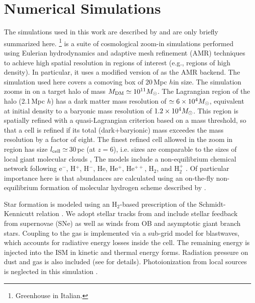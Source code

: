 \IfFileExists{emulateapjlegacy.cls}{\documentclass[iop]{emulateapjlegacy}}{\documentclass[iop]{emulateapj}}
\begin{document}
\section{Numerical Simulations}\label{sec:sim}
The simulations used in this work are described by \citealt{Pallottini17a, Pallottini17b} and are only briefly summarized here.
%
\footnote{Greenhouse in Italian.} is a suite of cosmological zoom-in simulations performed using Eulerian hydrodynamics and adaptive mesh refinement (AMR) techniques to achieve high spatial resolution in regions of interest (e.g., regions of high density).
%
In particular, it uses a modified version of  \citep{Teyssier02a} as the AMR backend. The simulation used here covers a comoving box of 20\,Mpc $h$\pmOne in size. The simulation zooms in on a target halo of mass $M_{\rm DM}\simeq10^{11} \mbox{$M_{\odot}$}$. The Lagrangian region of the halo (2.1\,Mpc $h$\pmOne) has a dark matter mass resolution of $\simeq 6\times 10^4 \mbox{$M_{\odot}$}$, equivalent at initial density to a baryonic mass resolution of $1.2 \times 10^4 \mbox{$M_{\odot}$}$. This region is spatially refined with a quasi-Lagrangian criterion based on a mass threshold, so that a cell is refined if its total (dark+baryionic) mass exceedes the mass resolution by a factor of eight. The finest refined cell allowed in the zoom in region has size $l_{\rm cell}\simeq$\,30\,pc (at $z = 6$), i.e. sizes are comparable to the sizes of local giant molecular clouds \citep[e.g.,][]{Sanders85a, Federrath13a, Goodman14a},
The models include a non-equilibrium chemical network following e$^{-}$, H$^+$, H$^-$, He, He$^+$, He$^{++}$, H$_2$, and H$_2^+$ \citep{Grassi14a,Bovino16a}. Of particular importance here is that abundances are calculated using an on-the-fly non-equilibrium formation of molecular hydrogen scheme described by \citet{Pallottini17a}.

Star formation is modeled using an H$_2$-based prescription of the Schmidt-Kennicutt relation \citep{Krumholz09a}. We adopt stellar tracks from  and include stellar feedback from supernovae (SNe) as well as winds from OB and asymptotic giant branch stars. Coupling to the gas is implemented via a sub-grid model for blastwaves, which accounts for radiative energy losses inside the cell. The remaining energy is injected into the ISM in kinetic and thermal energy forms. Radiation pressure on dust and gas is also included (see \citealt{Pallottini17a} for details). Photoionization from local sources is neglected in this simulation \citep[see][for its effect]{pallottini:2019,decataldo:2019}. 
\end{document}
